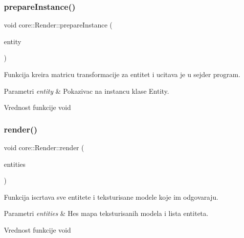 \subsubsection{\texorpdfstring{prepare\+Instance()}{prepareInstance()}}
{\footnotesize\ttfamily void core\+::\+Render\+::prepare\+Instance (\begin{DoxyParamCaption}\item[{\hyperlink{classentity_1_1Entity}{Entity} $\ast$}]{entity }\end{DoxyParamCaption})}



Funkcija kreira matricu transformacije za entitet i ucitava je u sejder program. 


\begin{DoxyParams}{Parametri}
{\em entity} & Pokazivac na instancu klase Entity. \\
\hline
\end{DoxyParams}
\begin{DoxyReturn}{Vrednost funkcije}
void 
\end{DoxyReturn}
\mbox{\label{classcore_1_1Render_ab36887be4cb2f56e73b10f78e5d04d4a}} 
\subsubsection{\texorpdfstring{render()}{render()}}
{\footnotesize\ttfamily void core\+::\+Render\+::render (\begin{DoxyParamCaption}\item[{map$<$ \hyperlink{classmodel_1_1TexturedModel}{Textured\+Model} $\ast$, list$<$ \hyperlink{classentity_1_1Entity}{Entity} $\ast$$>$$>$}]{entities }\end{DoxyParamCaption})}



Funkcija iscrtava sve entitete i teksturisane modele koje im odgovaraju. 


\begin{DoxyParams}{Parametri}
{\em entities} & Hes mapa teksturisanih modela i lista entiteta. \\
\hline
\end{DoxyParams}
\begin{DoxyReturn}{Vrednost funkcije}
void 
\end{DoxyReturn}
\mbox{\label{classcore_1_1Render_adfa16af79f2e428b94ccbb406e77ef93}} 
